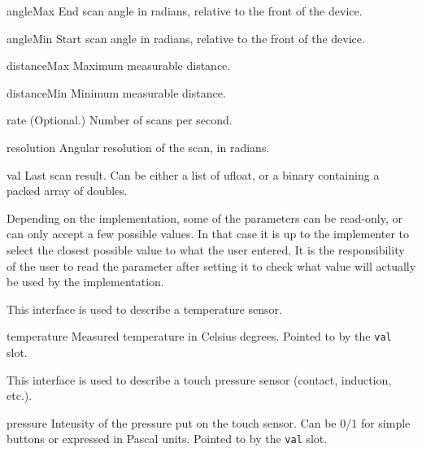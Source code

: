 \begin{urbiscriptapi}
\item[angleMax] End scan angle in radians, relative to the front of the
  device.


\item[angleMin] Start scan angle in radians, relative to the front of the
  device.


\item[distanceMax] Maximum measurable distance.


\item[distanceMin] Minimum measurable distance.


\item[rate]{} (Optional.) Number of scans per second.


\item[resolution] Angular resolution of the scan, in radians.


\item[val] Last scan result. Can be either a list of ufloat, or a binary
  containing a packed array of doubles.
\end{urbiscriptapi}

Depending on the implementation, some of the parameters can be read-only, or
can only accept a few possible values. In that case it is up to the implementer
to select the closest possible value to what the user entered. It is the
responsibility of the user to read the parameter after setting it to check
what value will actually be used by the implementation.


This interface is used to describe a temperature sensor.

\begin{urbiscriptapi}
\item[temperature] Measured temperature in Celsius degrees.  Pointed to by
  the \lstinline{val} slot.
\end{urbiscriptapi}


This interface is used to describe a touch pressure sensor (contact,
induction, etc.).

\begin{urbiscriptapi}
\item[pressure] Intensity of the pressure put on the touch sensor. Can be
  0/1 for simple buttons or expressed in Pascal units. Pointed to by the
  \lstinline{val} slot.
\end{urbiscriptapi}



